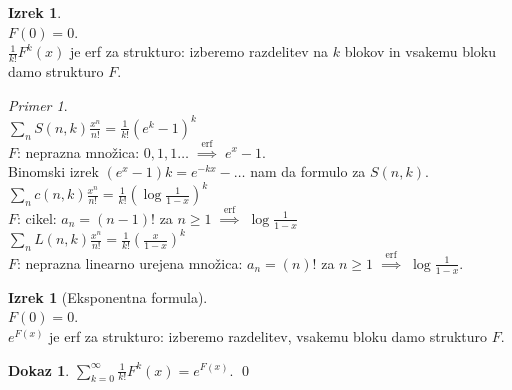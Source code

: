 \documentclass[a4paper, 12pt]{book}
\theoremstyle{definition}
\newtheorem{theorem}[counter]{Izrek}
\newtheorem{pro}[counter]{Dokaz}
\theoremstyle{remark}
\newtheorem*{ex}{Primer}
\begin{document}
\begin{theorem} \text{} \\
  $F(0) = 0$. \\
  $\frac{1}{k!} F^k(x)$ je erf za strukturo: izberemo razdelitev na $k$ blokov in vsakemu bloku damo strukturo $F$.
\end{theorem}
\begin{ex} \text{} \\
  $\sum_n S(n,k) \frac{x^n}{n!} = \frac{1}{k!} (e^k-1)^k$ \\
  $F$: neprazna množica: $0,1,1 \dots \; \stackrel{\text{erf}}{\implies} \; e^x-1$. \\
  Binomski izrek $(e^x-1)k = e^{-kx} - \dots$ nam da formulo za $S(n,k)$. \\
  $\sum_n c(n,k) \frac{x^n}{n!} = \frac{1}{k!} \left(\log \frac{1}{1-x}\right)^k$ \\
  $F$: cikel: $a_n = (n-1)!$ za $n \geq 1 \; \stackrel{\text{erf}}{\implies} \; \log \frac{1}{1-x}$ \\
  $\sum_n L(n,k) \frac{x^n}{n!} = \frac{1}{k!} \left(\frac{x}{1-x}\right)^k$ \\
  $F$: neprazna linearno urejena množica:
  $a_n = (n)!$ za $n \geq 1 \; \stackrel{\text{erf}}{\implies} \; \log \frac{1}{1-x}$. \\
\end{ex}
\begin{theorem}[Eksponentna formula] \text{} \\
  $F(0) = 0$. \\
  $e^{F(x)}$ je erf za strukturo: izberemo razdelitev, vsakemu bloku damo strukturo $F$.
\end{theorem}
\begin{pro}
  $\sum_{k=0}^{\infty} \frac{1}{k!} F^k(x) = e^{F(x)}$.
  \qed
\end{pro}
\end{document}

